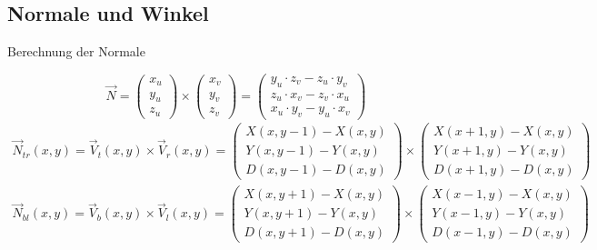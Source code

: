 \documentclass{VLKlauck}
\begin{document}
	\subsection{Normale und Winkel}
	\begin{frame}{Berechnung der Normale}
	
	{\tiny
			\begin{equation}
		 		\vec{N} =        \left( \begin{array}{c} x_u                           \\                           y_u \\ z_u                           \end{array} \right) 
		           \times \left( \begin{array}{c} x_v                           \\                           y_v \\ z_v                           \end{array} \right) 
		         =        \left( \begin{array}{c} y_u \cdot z_v - z_u \cdot y_v \\ z_u \cdot x_v - z_v \cdot x_u \\ x_u \cdot y_v - y_u \cdot x_v \end{array}\right)
				\nonumber
			\end{equation}
			\begin{gather}
		 \vec{N}_{tr}(x,y)=    \vec{V}_t(x,y) \times \vec{V}_r(x,y) =
		                  \left( \begin{array}{c}   X(x,y-1) -  X(x,y)  \\ Y(x,y-1) -  Y(x,y) \\ D(x,y-1) -  D(x,y)\end{array} \right) 
		           \times \left( \begin{array}{c}   X(x+1,y) -  X(x,y)  \\ Y(x+1,y) -  Y(x,y) \\ D(x+1,y) -  D(x,y)\end{array} \right)\nonumber\\
		 \vec{N}_{bl}(x,y)=    \vec{V}_b(x,y) \times \vec{V}_l(x,y) =
		                  \left( \begin{array}{c}   X(x,y+1) -  X(x,y)  \\ Y(x,y+1) -  Y(x,y) \\ D(x,y+1) -  D(x,y)\end{array} \right) 
		           \times \left( \begin{array}{c}   X(x-1,y) -  X(x,y)  \\ Y(x-1,y) -  Y(x,y) \\ D(x-1,y) -  D(x,y)\end{array} \right)\nonumber

\end{gather}}
\end{frame}
\end{document}
